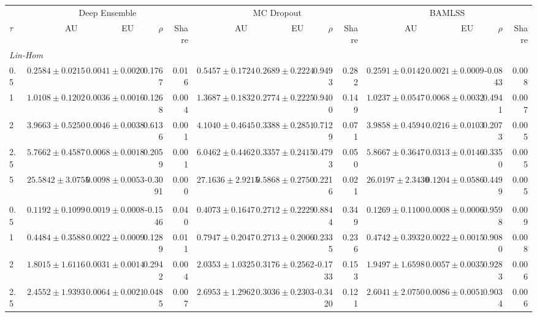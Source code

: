 \begin{tabular}{lrrrrrrrrrrrr}
\toprule
 & \multicolumn{4}{c}{Deep Ensemble} & \multicolumn{4}{c}{MC Dropout} & \multicolumn{4}{c}{BAMLSS} \\
\cmidrule(lr){2-5} \cmidrule(lr){6-9} \cmidrule(lr){10-13}
$\tau$ & AU & EU & $\rho$ & Share & AU & EU & $\rho$ & Share & AU & EU & $\rho$ & Share \\
\midrule
\multicolumn{13}{l}{\textit{Lin-Hom}} \\
0.5 & $0.2584 \pm 0.0215$ & $0.0041 \pm 0.0020$ & 0.1767 & 0.016 & $0.5457 \pm 0.1724$ & $0.2689 \pm 0.2224$ & 0.9493 & 0.282 & $0.2591 \pm 0.0142$ & $0.0021 \pm 0.0009$ & -0.0843 & 0.008 \\
1 & $1.0108 \pm 0.1202$ & $0.0036 \pm 0.0016$ & 0.1268 & 0.004 & $1.3687 \pm 0.1832$ & $0.2774 \pm 0.2225$ & 0.9400 & 0.149 & $1.0237 \pm 0.0547$ & $0.0068 \pm 0.0032$ & 0.4941 & 0.007 \\
2 & $3.9663 \pm 0.5250$ & $0.0046 \pm 0.0038$ & 0.6136 & 0.001 & $4.1040 \pm 0.4645$ & $0.3388 \pm 0.2851$ & 0.7129 & 0.071 & $3.9858 \pm 0.4594$ & $0.0216 \pm 0.0103$ & 0.2073 & 0.005 \\
2.5 & $5.7662 \pm 0.4587$ & $0.0068 \pm 0.0018$ & 0.2059 & 0.001 & $6.0462 \pm 0.4462$ & $0.3357 \pm 0.2415$ & 0.4793 & 0.050 & $5.8667 \pm 0.3647$ & $0.0313 \pm 0.0146$ & 0.3350 & 0.005 \\
5 & $25.5842 \pm 3.0755$ & $0.0098 \pm 0.0053$ & -0.3091 & 0.000 & $27.1636 \pm 2.9215$ & $0.5868 \pm 0.2750$ & 0.2216 & 0.021 & $26.0197 \pm 2.3430$ & $0.1204 \pm 0.0586$ & 0.4499 & 0.005 \\
\addlinespace
\multicolumn{13}{l}{\textit{Lin-Het}} \\
0.5 & $0.1192 \pm 0.1099$ & $0.0019 \pm 0.0008$ & -0.1546 & 0.040 & $0.4073 \pm 0.1647$ & $0.2712 \pm 0.2229$ & 0.8844 & 0.349 & $0.1269 \pm 0.1100$ & $0.0008 \pm 0.0006$ & 0.9598 & 0.009 \\
1 & $0.4484 \pm 0.3588$ & $0.0022 \pm 0.0009$ & 0.1289 & 0.011 & $0.7947 \pm 0.2047$ & $0.2713 \pm 0.2006$ & 0.2335 & 0.236 & $0.4742 \pm 0.3932$ & $0.0022 \pm 0.0015$ & 0.9080 & 0.008 \\
2 & $1.8015 \pm 1.6116$ & $0.0031 \pm 0.0014$ & 0.2942 & 0.004 & $2.0353 \pm 1.0325$ & $0.3176 \pm 0.2562$ & -0.1733 & 0.153 & $1.9497 \pm 1.6598$ & $0.0057 \pm 0.0035$ & 0.9283 & 0.006 \\
2.5 & $2.4552 \pm 1.9393$ & $0.0064 \pm 0.0021$ & 0.0485 & 0.007 & $2.6953 \pm 1.2962$ & $0.3036 \pm 0.2303$ & -0.3420 & 0.121 & $2.6041 \pm 2.0750$ & $0.0086 \pm 0.0051$ & 0.9034 & 0.006 \\

\end{tabular}
